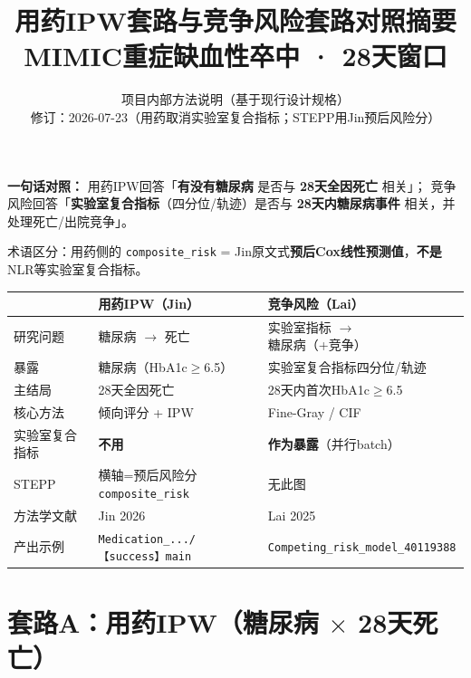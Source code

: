 \documentclass[11pt,a4paper]{article}
\title{\textbf{用药IPW套路与竞争风险套路对照摘要}\\[0.4em]
\large MIMIC重症缺血性卒中 · 28天窗口}
\author{项目内部方法说明（基于现行设计规格）\\
\small 修订：2026-07-23（用药取消实验室复合指标；STEPP用Jin预后风险分）}
\date{}
\begin{document}
\maketitle
\thispagestyle{fancy}

\noindent
\textbf{一句话对照：}
用药IPW回答「\textbf{有没有糖尿病} 是否与 \textbf{28天全因死亡} 相关」；
竞争风险回答「\textbf{实验室复合指标}（四分位/轨迹）是否与 \textbf{28天内糖尿病事件} 相关，并处理死亡/出院竞争」。

\noindent\small\color{gray!40!black}
术语区分：用药侧的 \texttt{composite\_risk} = Jin原文式\textbf{预后Cox线性预测值}，\textbf{不是}NLR等实验室复合指标。

\vspace{0.5em}
\begin{center}
\small
\begin{tabular}{@{}L{0.22\textwidth}L{0.36\textwidth}L{0.36\textwidth}@{}}
\toprule
& \textbf{用药IPW（Jin）} & \textbf{竞争风险（Lai）} \\
\midrule
研究问题 & 糖尿病 $\rightarrow$ 死亡 & 实验室指标 $\rightarrow$ 糖尿病（+竞争） \\
暴露 & 糖尿病（HbA1c$\geq$6.5） & 实验室复合指标四分位/轨迹 \\
主结局 & 28天全因死亡 & 28天内首次HbA1c$\geq$6.5 \\
核心方法 & 倾向评分 + IPW & Fine-Gray / CIF \\
实验室复合指标 & \textbf{不用} & \textbf{作为暴露}（并行batch） \\
STEPP & 横轴=预后风险分\texttt{composite\_risk} & 无此图 \\
方法学文献 & Jin 2026 & Lai 2025 \\
产出示例 & \texttt{Medication\_.../【success】main} & \texttt{Competing\_risk\_model\_40119388} \\
\bottomrule
\end{tabular}
\end{center}

\section{套路A：用药IPW（糖尿病 $\times$ 28天死亡）}
\end{document}
